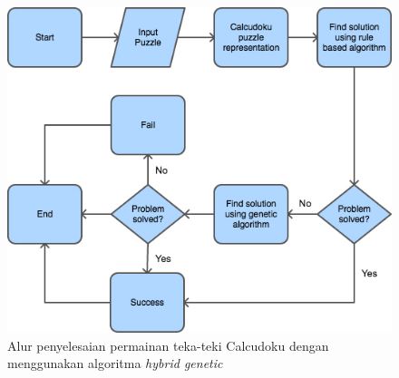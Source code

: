 \begin{figure}
\centering
\captionsetup{justification=centering}
\includegraphics[scale=0.75]{Gambar/HybridGenetic7}
\caption[Alur penyelesaian permainan teka-teki Calcudoku dengan menggunakan algoritma \textit{hybrid genetic} ~\cite{johanna:12:hybrid}]{Alur penyelesaian permainan teka-teki Calcudoku dengan menggunakan algoritma \textit{hybrid genetic} ~\cite{johanna:12:hybrid}}
\label{fig:hybrid7}
\end{figure}